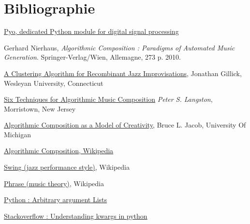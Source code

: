 \documentclass[letterpaper,12pt]{scrartcl}
\begin{document}
\section{Bibliographie} 
\begin{thebibliography}{9}
   
    \href{http://ajaxsoundstudio.com/software/pyo/}{Pyo, dedicated Python module for digital signal processing}
   
          Gerhard Nierhaus,
          \emph{Algorithmic Composition : Paradigms of Automated Music Generation}.
          Springer-Verlag/Wien, Allemagne,
          273 p.
          2010.
          
     \href{http://wesscholar.wesleyan.edu/cgi/viewcontent.cgi?article=1344&context=etd_hon_theses}{A Clustering Algorithm for Recombinant Jazz Improvisations}, Jonathan Gillick, Wesleyan University, Connecticut
    
	 \href{http://peterlangston.com/Papers/amc.pdf}{Six Techniques for Algorithmic Music Composition} \emph{Peter S. Langston}, Morristown, New Jersey

	 \href{http://www.ece.umd.edu/~blj/algorithmic_composition/algorithmicmodel.html}{Algorithmic Composition as a Model of Creativity}, Bruce L. Jacob, University Of Michigan
	
	 \href{https://en.wikipedia.org/wiki/Algorithmic_composition}{Algorithmic Composition, Wikipedia}
	
	 \href{https://en.wikipedia.org/wiki/Swing_(jazz_performance_style)}{Swing (jazz performance style)}, Wikipedia
	
	 \href{https://en.wikipedia.org/wiki/Phrase_(music_theory)}{Phrase (music theory)}, Wikipedia

	 \href{https://docs.python.org/2/tutorial/controlflow.html#arbitrary-argument-lists}{Python : Arbitrary argument Lists}
	
	 \href{https://stackoverflow.com/questions/1769403/understanding-kwargs-in-python}{Stackoverflow : Understanding kwargs in python}
\end{thebibliography}
\end{document}
